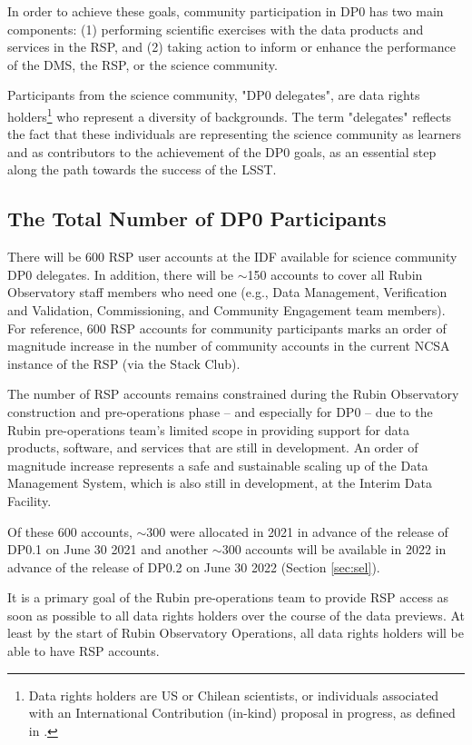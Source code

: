 \documentclass[DM,lsstdraft,authoryear,toc]{lsstdoc}
\begin{document}
In order to achieve these goals, community participation in DP0 has two main components:
(1) performing scientific exercises with the data products and services in the RSP, and
(2) taking action to inform or enhance the performance of the DMS, the RSP, or the science community.

Participants from the science community, "DP0 delegates", are data rights holders\footnote{Data rights holders are US or Chilean scientists, or individuals associated with an International Contribution (in-kind) proposal in progress, as defined in .} who represent a diversity of backgrounds.
The term "delegates" reflects the fact that these individuals are representing the science community as learners and as contributors to the achievement of the DP0 goals, as an essential step along the path towards the success of the LSST. 


\subsection{The Total Number of DP0 Participants}

There will be 600 RSP user accounts at the IDF available for science community DP0 delegates.
In addition, there will be $\sim$150 accounts to cover all Rubin Observatory staff members who need one (e.g., Data Management, Verification and Validation, Commissioning, and Community Engagement team members).
For reference, 600 RSP accounts for community participants marks an order of magnitude increase in the number of community accounts in the current NCSA instance of the RSP (via the Stack Club).

The number of RSP accounts remains constrained during the Rubin Observatory construction and pre-operations phase -- and especially for DP0 -- due to the Rubin pre-operations team's limited scope in providing support for data products, software, and services that are still in development.
An order of magnitude increase represents a safe and sustainable scaling up of the Data Management System, which is also still in development, at the Interim Data Facility.

Of these 600 accounts, $\sim$300 were allocated in 2021 in advance of the release of DP0.1 on June 30 2021 and another $\sim$300 accounts will be available in 2022 in advance of the release of DP0.2 on June 30 2022 (Section \ref{sec:sel}).

It is a primary goal of the Rubin pre-operations team to provide RSP access as soon as possible to all data rights holders over the course of the data previews. 
At least by the start of Rubin Observatory Operations, all data rights holders will be able to have RSP accounts.
\end{document}
